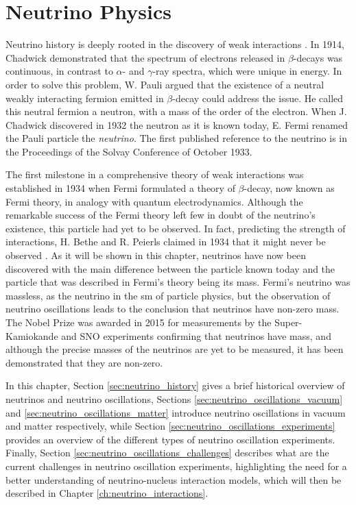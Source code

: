 \chapter{Neutrino Physics}
\label{ch:neutrino_physics}

Neutrino history is deeply rooted in the discovery of weak interactions \cite{winter}. In 1914, Chadwick demonstrated that the spectrum of electrons released in $\beta$-decays was continuous, in contrast to $\alpha$- and $\gamma$-ray spectra, which were unique in energy. In order to solve this problem, W. Pauli argued that the existence of a neutral weakly interacting fermion emitted in $\beta$-decay could address the issue. He called this neutral fermion a neutron, with a mass of the order of the electron. 
When J. Chadwick discovered in 1932 the neutron as it is known today, E. Fermi renamed the Pauli particle the \emph{neutrino}. The first published reference to the neutrino is in the Proceedings of the Solvay Conference of October 1933. 


The first milestone in a comprehensive theory of weak interactions was established in 1934 when Fermi formulated a theory of $\beta$-decay, now known as Fermi theory, in analogy with quantum electrodynamics.
Although the remarkable success of the Fermi theory left few in doubt of the neutrino's existence, this particle had yet to be observed. In fact, predicting the strength of interactions, H. Bethe and R. Peierls claimed in 1934 that it might never be observed \cite{bethe}.
As it will be shown in this chapter, neutrinos have now been discovered with the main difference between the particle known today and the particle that was described in Fermi's theory being its mass. Fermi's neutrino was massless, as the neutrino in the \acrshort{sm} of particle physics, but the observation of neutrino oscillations leads to the conclusion that neutrinos have non-zero mass. The Nobel Prize was awarded in 2015 for measurements by the Super-Kamiokande \cite{superk} and SNO \cite{sno} experiments confirming that neutrinos have mass, and although the precise masses of the neutrinos are yet to be measured, it has been demonstrated that they are non-zero. 

In this chapter, Section \ref{sec:neutrino_history} gives a brief historical overview of neutrinos and neutrino oscillations, Sections \ref{sec:neutrino_oscillations_vacuum} and \ref{sec:neutrino_oscillations_matter} introduce neutrino oscillations in vacuum and matter respectively, while Section \ref{sec:neutrino_oscillations_experiments} provides an overview of the different types of neutrino oscillation experiments. Finally, Section \ref{sec:neutrino_oscillations_challenges} describes what are the current challenges in neutrino oscillation experiments, highlighting the need for a better understanding of neutrino-nucleus interaction models, which will then be described in Chapter \ref{ch:neutrino_interactions}.



